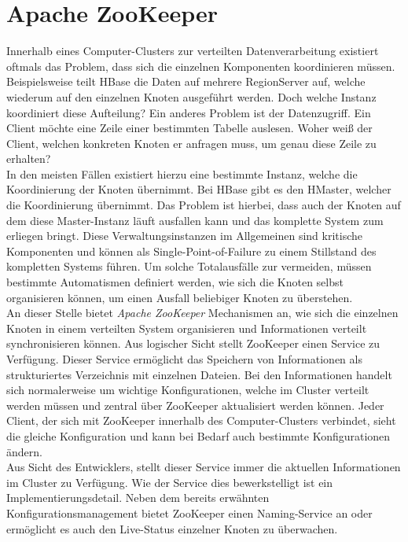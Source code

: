 \noindent


\section{Apache ZooKeeper}
\label{sec:theory_zookeeper}

Innerhalb eines Computer-Clusters zur verteilten Datenverarbeitung existiert oftmals das Problem, dass sich die einzelnen Komponenten koordinieren müssen. Beispielsweise teilt HBase die Daten auf mehrere RegionServer auf, welche wiederum auf den einzelnen Knoten ausgeführt werden. Doch welche Instanz koordiniert diese Aufteilung? Ein anderes Problem ist der Datenzugriff. Ein Client möchte eine Zeile einer bestimmten Tabelle auslesen. Woher weiß der Client, welchen konkreten Knoten er anfragen muss, um genau diese Zeile zu erhalten?\\ 
In den meisten Fällen existiert hierzu eine bestimmte Instanz, welche die Koordinierung der Knoten übernimmt. Bei HBase gibt es den HMaster, welcher die Koordinierung übernimmt. Das Problem ist hierbei, dass auch der Knoten auf dem diese Master-Instanz läuft ausfallen kann und das komplette System zum erliegen bringt. Diese Verwaltungsinstanzen im Allgemeinen sind kritische Komponenten und können als Single-Point-of-Failure zu einem Stillstand des kompletten Systems führen. Um solche Totalausfälle zur vermeiden, müssen bestimmte Automatismen definiert werden, wie sich die Knoten selbst organisieren können, um einen Ausfall beliebiger Knoten zu überstehen.\\

\noindent
An dieser Stelle bietet \textit{Apache ZooKeeper\texttrademark\thinspace} Mechanismen an, wie sich die einzelnen Knoten in einem verteilten System organisieren und Informationen verteilt synchronisieren können. Aus logischer Sicht stellt ZooKeeper einen Service zu Verfügung. 
Dieser Service ermöglicht das Speichern von Informationen als strukturiertes Verzeichnis mit einzelnen Dateien. Bei den Informationen handelt sich normalerweise um wichtige Konfigurationen, welche im Cluster verteilt werden müssen und zentral über ZooKeeper aktualisiert werden können. Jeder Client, der sich mit ZooKeeper innerhalb des Computer-Clusters verbindet, sieht die gleiche Konfiguration und kann bei Bedarf auch bestimmte Konfigurationen ändern.\cite[S. 4 ff]{professional_hadoop} \\
Aus Sicht des Entwicklers, stellt dieser Service immer die aktuellen Informationen im Cluster zu Verfügung. Wie der Service dies bewerkstelligt ist ein Implementierungsdetail. 
Neben dem bereits erwähnten Konfigurationsmanagement bietet ZooKeeper einen Naming-Service an oder ermöglicht es auch den Live-Status einzelner Knoten zu überwachen.\cite{zookeeper_essentials}\\

